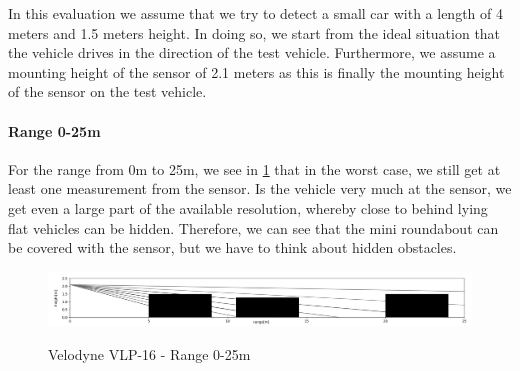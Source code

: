 \documentclass[11pt,oneside,openright]{mpreport}
\begin{document}

In this evaluation we assume that we try to detect a small car with a length of 4 meters and 1.5 meters height. In doing so, we start from
the ideal situation that the vehicle drives in the direction of the test vehicle.
Furthermore, we assume a mounting height of the sensor of 2.1 meters as this is finally the mounting height of the sensor on the test vehicle.

\paragraph{Range 0-25m}

For the range from 0m to 25m, we see in \cref{velodyne_range_25} that in the worst case, we still get at least one measurement from the sensor. 
Is the vehicle very much at the sensor, we get even a large part of the available resolution, whereby close to behind lying flat vehicles can be hidden. Therefore, we can see 
that the mini roundabout can be covered with the sensor, but we have to think about hidden obstacles.

\begin{figure}[!ht]
\caption{Velodyne VLP-16 - Range 0-25m}
\includegraphics[width=\textwidth]{bilder/range_25.png}
\label{velodyne_range_25}
\end{figure}
\end{document}
